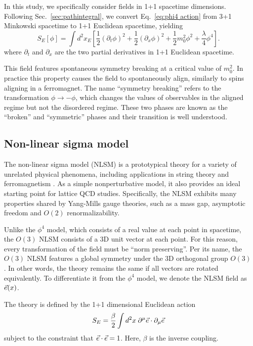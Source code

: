 In this study, we specifically consider fields in 1+1 spacetime dimensions. Following Sec.~\ref{sec:pathintegral}, we convert Eq.~\ref{eq:phi4 action} from 3+1 Minkowski spacetime to 1+1 Euclidean spacetime, yielding
\begin{equation}
    \label{eq:phi4 euclidean action}
    S_E[\phi] = \int d^2 x_E \left[\frac{1}{2}\left(\partial_t \phi\right)^2 + \frac{1}{2} \left(\partial_x \phi \right)^2 + \frac{1}{2} m_0^2 \phi^2 + \frac{\lambda}{4}\phi^4\right].
\end{equation}
where $\partial_t$ and $\partial_x$ are the two partial derivatives in 1+1 Euclidean spacetime. 

This field features spontaneous symmetry breaking at a critical value of $m_0^2$. In practice this property causes the field to spontaneously align, similarly to spins aligning in a ferromagnet. The name ``symmetry breaking'' refers to the transformation $\phi\rightarrow-\phi$, which changes the values of observables in the aligned regime but not the disordered regime. These two phases are known as the ``broken'' and ``symmetric'' phases and their transition is well understood.


\subsection{Non-linear sigma model}
The non-linear sigma model (NLSM) is a prototypical theory for a variety of unrelated physical phenomena, including applications in string theory \cite{callan1985} and ferromagnetism \cite{polyakov1975}. As a simple nonperturbative model, it also provides an ideal starting point for lattice QCD studies. Specifically, the NLSM exhibits many properties shared by Yang-Mills gauge theories, such as a mass gap, asymptotic freedom and $O(2)$ renormalizability. 

Unlike the $\phi^4$ model, which consists of a real value at each point in spacetime, the $O(3)$ NLSM consists of a 3D unit vector at each point. For this reason, every transformation of the field must be ``norm preserving''. Per its name, the $O(3)$ NLSM features a global symmetry under the 3D orthogonal group $O(3)$. In other words, the theory remains the same if all vectors are rotated equivalently. To differentiate it from the $\phi^4$ model, we denote the NLSM field as $\vec e(x)$.

The theory is defined by the 1+1 dimensional Euclidean action 
\begin{equation}
    \label{eq:nlsm euclidean action}
    S_E = \frac{\beta}{2} \int d^2x \; \partial^\mu \vec e \cdot \partial_\mu \vec e
\end{equation}
subject to the constraint that $\vec e\cdot\vec e = 1$. Here, $\beta$ is the inverse coupling.

